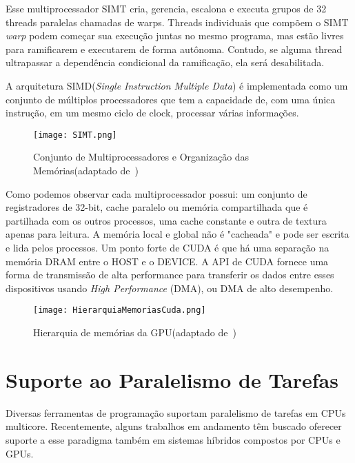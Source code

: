 Esse multiprocessador SIMT cria, gerencia, escalona e executa grupos de 32 threads paralelas chamadas de warps. Threads individuais que compõem o SIMT \textit{warp} podem começar sua execução juntas no mesmo programa, mas estão livres para ramificarem e executarem de forma autônoma. Contudo, se alguma thread ultrapassar a dependência condicional da ramificação, ela será desabilitada. 

A arquitetura SIMD(\textit{Single Instruction Multiple Data}) é implementada como um conjunto de múltiplos processadores que tem a capacidade de, com uma única instrução, em um mesmo ciclo de clock, processar várias informações.

\begin{figure}[!htb]
	\begin{center}
	\centering
			\texttt{[image: SIMT.png]}
	\caption{Conjunto de Multiprocessadores e Organização das Memórias(adaptado de~\citep{cuda})}
	\label{fig: SIMT}
	\end{center}
\end{figure}

Como podemos observar cada multiprocessador possui: um conjunto de registradores de 32-bit, cache paralelo ou memória compartilhada que é partilhada com os outros processos, uma cache constante e outra de textura apenas para leitura. A memória local e global não é "cacheada" e pode ser escrita e lida pelos processos.
Um ponto forte de CUDA é que há uma separação na memória DRAM entre o HOST e o DEVICE. A API de CUDA fornece uma forma de transmissão de alta performance para transferir os dados entre esses dispositivos usando \textit{High Performance} (DMA), ou DMA de alto desempenho.

\begin{figure}[!htb]
	\begin{center}
	\centering
			\texttt{[image: HierarquiaMemoriasCuda.png]}
	\caption{Hierarquia de memórias da GPU(adaptado de~\citep{cuda})}
	\label{fig: HierarquiaMemoriasCuda}
	\end{center}
\end{figure}


\section{Suporte ao Paralelismo de Tarefas}
Diversas ferramentas de programação suportam paralelismo de tarefas em CPUs multicore. Recentemente, alguns trabalhos em andamento têm buscado oferecer suporte a esse paradigma também em sistemas híbridos compostos por CPUs e GPUs.




